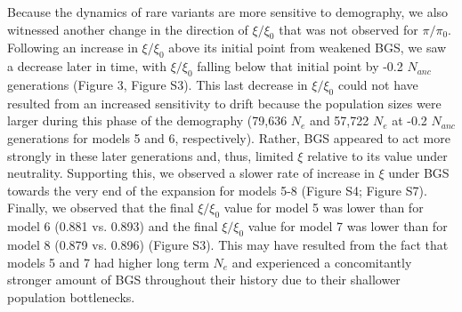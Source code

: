 \documentclass[9pt,twocolumn,twoside]{rilabRxiv}
\begin{document}
Because the dynamics of rare variants are more sensitive to demography,
we also witnessed another change in the direction of
$\xi/\xi_0$ that was not observed for $\pi/\pi_0$.
Following an increase in $\xi/\xi_0$ above its initial point
from weakened BGS, we saw a decrease later in time, with
$\xi/\xi_0$ falling below that initial point by -0.2
$N_{anc}$ generations (Figure 3, Figure S3). This last
decrease in $\xi/\xi_0$ could not have resulted from an
increased sensitivity to drift because the population sizes were larger
during this phase of the demography (79,636 $N_e$
and 57,722 $N_e$ at -0.2 $N_{anc}$
generations for models 5 and 6, respectively). Rather, BGS appeared to
act more strongly in these later generations and, thus, limited $\xi$
relative to its value under neutrality. Supporting this, we observed a
slower rate of increase in $\xi$ under BGS towards the very end of the
expansion for models 5-8 (Figure S4; Figure S7). Finally, we observed
that the final $\xi/\xi_0$ value for model 5 was lower than for
model 6 (0.881 vs. 0.893) and the final $\xi/\xi_0$ value for
model 7 was lower than for model 8 (0.879 vs. 0.896) (Figure S3). This
may have resulted from the fact that models 5 and 7 had higher long term
$N_e$ and experienced a concomitantly stronger
amount of BGS throughout their history due to their shallower population
bottlenecks.
\end{document}
